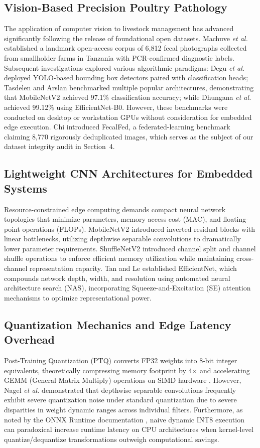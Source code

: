 \documentclass[11pt,a4paper]{article}
\begin{document}
\subsection{Vision-Based Precision Poultry Pathology}
The application of computer vision to livestock management has advanced significantly following the release of foundational open datasets. Machuve \textit{et al.} \cite{machuve2022} established a landmark open-access corpus of 6,812 fecal photographs collected from smallholder farms in Tanzania with PCR-confirmed diagnostic labels. Subsequent investigations explored various algorithmic paradigms: Degu \textit{et al.} \cite{degu2023} deployed YOLO-based bounding box detectors paired with classification heads; Tasdelen and Arslan \cite{tasdelen2025} benchmarked multiple popular architectures, demonstrating that MobileNetV2 achieved 97.1\% classification accuracy; while Dhungana \textit{et al.} \cite{dhungana2025} achieved 99.12\% using EfficientNet-B0. However, these benchmarks were conducted on desktop or workstation GPUs without consideration for embedded edge execution. Chi \cite{chi2026} introduced FecalFed, a federated-learning benchmark claiming 8,770 rigorously deduplicated images, which serves as the subject of our dataset integrity audit in Section~4.

\subsection{Lightweight CNN Architectures for Embedded Systems}
Resource-constrained edge computing demands compact neural network topologies that minimize parameters, memory access cost (MAC), and floating-point operations (FLOPs). MobileNetV2 \cite{mobilenetv2} introduced inverted residual blocks with linear bottlenecks, utilizing depthwise separable convolutions to dramatically lower parameter requirements. ShuffleNetV2 \cite{shufflenetv2} introduced channel split and channel shuffle operations to enforce efficient memory utilization while maintaining cross-channel representation capacity. Tan and Le \cite{efficientnet} established EfficientNet, which compounds network depth, width, and resolution using automated neural architecture search (NAS), incorporating Squeeze-and-Excitation (SE) attention mechanisms to optimize representational power.

\subsection{Quantization Mechanics and Edge Latency Overhead}
Post-Training Quantization (PTQ) converts FP32 weights into 8-bit integer equivalents, theoretically compressing memory footprint by 4$\times$ and accelerating GEMM (General Matrix Multiply) operations on SIMD hardware \cite{jacob2018}. However, Nagel \textit{et al.} \cite{nagel2021} demonstrated that depthwise separable convolutions frequently exhibit severe quantization noise under standard quantization due to severe disparities in weight dynamic ranges across individual filters. Furthermore, as noted by the ONNX Runtime documentation \cite{onnxruntime2024}, naive dynamic INT8 execution can paradoxical increase runtime latency on CPU architectures when kernel-level quantize/dequantize transformations outweigh computational savings.
\end{document}
